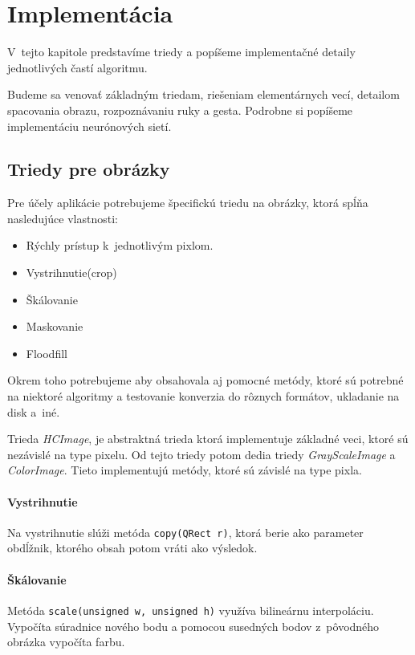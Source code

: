\chapter{Implementácia}\label{chap:implementation}

V~tejto kapitole predstavíme triedy a popíšeme implementačné detaily jednotlivých častí algoritmu.

Budeme sa venovať základným triedam, riešeniam elementárnych vecí, detailom spacovania obrazu, rozpoznávaniu ruky a gesta. Podrobne si popíšeme implementáciu neurónových sietí.
\bigskip

\section{Triedy pre obrázky}

Pre účely aplikácie potrebujeme špecifickú triedu na obrázky, ktorá spĺňa nasledujúce vlastnosti:
\begin{itemize}
\item Rýchly prístup k~jednotlivým pixlom.
\item Vystrihnutie(crop)
\item Škálovanie
\item Maskovanie
\item Floodfill
\end{itemize}
Okrem toho potrebujeme aby obsahovala aj pomocné metódy, ktoré sú potrebné na niektoré algoritmy a testovanie konverzia do rôznych formátov, ukladanie na disk a~iné.

Trieda \textit{HCImage}, je abstraktná trieda ktorá implementuje základné veci, ktoré sú nezávislé na type pixelu. Od tejto triedy potom dedia triedy \textit{GrayScaleImage} a \textit{ColorImage}. Tieto implementujú metódy, ktoré sú závislé na type pixla. 

\subsubsection{Vystrihnutie}
Na vystrihnutie slúži metóda {\tt copy(QRect r)}, ktorá berie ako parameter obdĺžnik, ktorého obsah potom vráti ako výsledok. 

\subsubsection{Škálovanie}
Metóda {\tt scale(unsigned w, unsigned h)} využíva bilineárnu interpoláciu. Vypočíta súradnice nového bodu a pomocou susedných bodov z~pôvodného obrázka vypočíta farbu.

